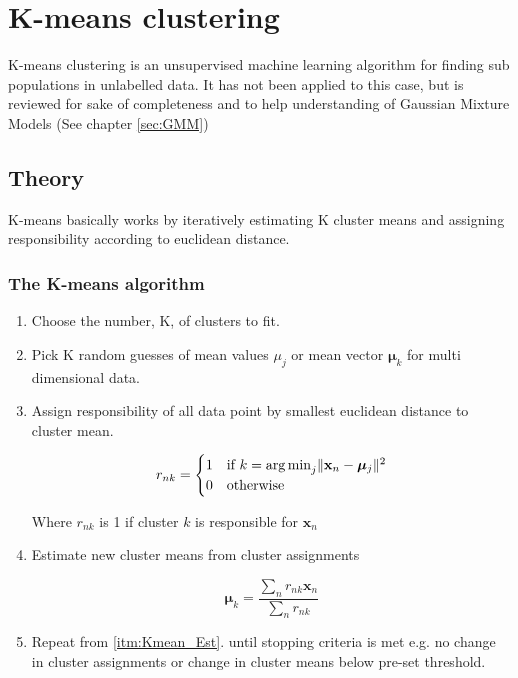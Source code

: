 \chapter{K-means clustering}
K-means clustering is an unsupervised machine learning algorithm for finding sub populations in unlabelled data.
It has not been applied to this case, but is reviewed for sake of completeness and to help understanding of Gaussian Mixture Models (See chapter \ref{sec:GMM}) 
\section{Theory} 

K-means basically works by iteratively estimating K cluster means and assigning responsibility according to euclidean distance.

\subsection{The K-means algorithm}
\begin{enumerate}

\item
Choose the number, K, of clusters to fit.

\item
Pick K random guesses of mean values $ \mu_j $ or mean vector $ \bm{\mu}_k $ for multi dimensional data.

\item \label{itm:Kmean_Est}
Assign responsibility of all data point by smallest euclidean distance to cluster mean.

\begin{equation}
r_{nk} =
  \begin{cases}
    1 & \text{if } k = 
    	\operatorname*{arg\,min}_j \lVert \mathbf{x}_n - \bm{\mu}_j \rVert^2\\
    0 & \text{otherwise}
  \end{cases} 
\end{equation}

Where $ r_{nk} $ is 1 if cluster $ k $ is responsible for $ \mathbf{x}_n $ 

\item \label{itm:Kmean_Max}
Estimate new cluster means from cluster assignments

\begin{equation}
\bm{\mu}_k = 
\dfrac{\sum_n r_{nk}\mathbf{x}_n}
{\sum_n r_{nk}}
\end{equation}

\item
Repeat from \ref{itm:Kmean_Est}. until stopping criteria is met e.g. no change in cluster assignments or change in cluster means below pre-set threshold. 

\end{enumerate}
